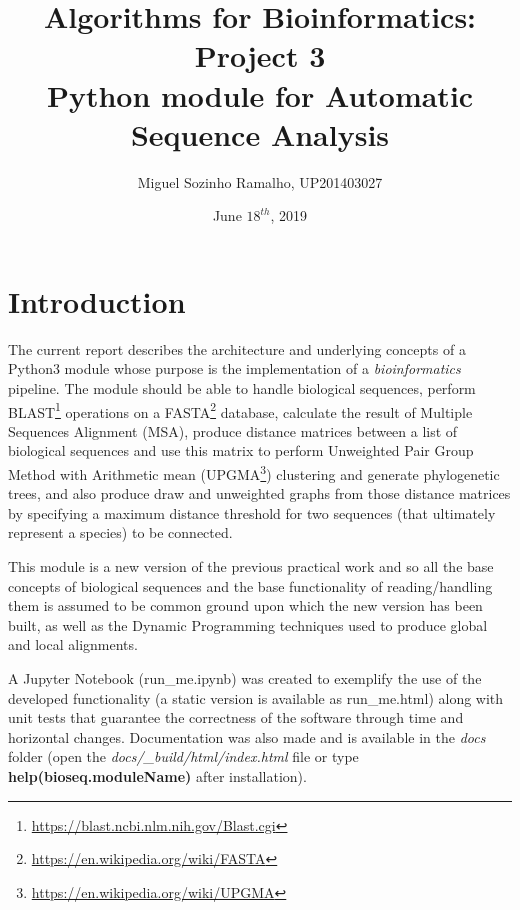 \documentclass[11pt]{article}
\begin{document}
\author{Miguel Sozinho Ramalho, UP201403027}
\date{June $18^{th}$, 2019}
\title{Algorithms for Bioinformatics: Project 3\\Python module for Automatic Sequence Analysis}
\maketitle


\section{Introduction}
The current report describes the architecture and underlying concepts of a Python3 module whose purpose is the implementation of a \textit{bioinformatics} pipeline. The module should be able to handle biological sequences, perform BLAST\footnote{\url{https://blast.ncbi.nlm.nih.gov/Blast.cgi}} operations on a FASTA\footnote{\url{https://en.wikipedia.org/wiki/FASTA}} database, calculate the result of Multiple Sequences Alignment (MSA), produce distance matrices between a list of biological sequences and use this matrix to perform Unweighted Pair Group Method with Arithmetic mean (UPGMA\footnote{\url{https://en.wikipedia.org/wiki/UPGMA}}) clustering and generate phylogenetic trees, and also produce draw and unweighted graphs from those distance matrices by specifying a maximum distance threshold for two sequences (that ultimately represent a species) to be connected. 

This module is a new version of the previous practical work and so all the base concepts of biological sequences and the base functionality of reading/handling them is assumed to be common ground upon which the new version has been built, as well as the Dynamic Programming techniques used to produce global and local alignments. 

A Jupyter Notebook (run\_me.ipynb) was created to exemplify the use of the developed functionality (a static version is available as run\_me.html) along with unit tests that guarantee the correctness of the software through time and horizontal changes. Documentation was also made and is available in the \textit{docs} folder (open the \textit{docs/\_build/html/index.html} file  or type \textbf{help(bioseq.moduleName)} after installation). 
\end{document}
